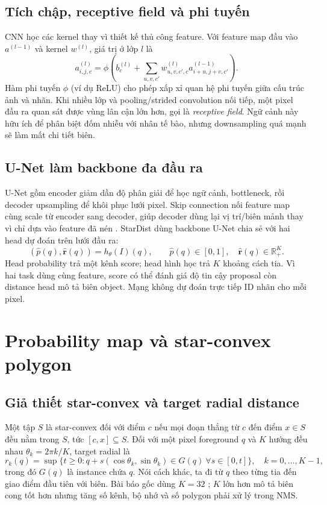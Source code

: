 \documentclass[12pt,a4paper]{report}
\begin{document}
\subsection{Tích chập, receptive field và phi tuyến}
CNN học các kernel thay vì thiết kế thủ công feature. Với feature map đầu vào
$a^{(l-1)}$ và kernel $w^{(l)}$, giá trị ở lớp $l$ là
\begin{equation}
 a_{i,j,c}^{(l)}=\phi\left(b_c^{(l)}+\sum_{u,v,c'}w_{u,v,c',c}^{(l)}
 a_{i+u,j+v,c'}^{(l-1)}\right).
 \label{eq:convolution}
\end{equation}
Hàm phi tuyến $\phi$ (ví dụ ReLU) cho phép xấp xỉ quan hệ phi tuyến giữa cấu
trúc ảnh và nhãn. Khi nhiều lớp và pooling/strided convolution nối tiếp, một
pixel đầu ra quan sát được vùng lân cận lớn hơn, gọi là \emph{receptive field}.
Ngữ cảnh này hữu ích để phân biệt đốm nhiễu với nhân tế bào, nhưng downsampling
quá mạnh sẽ làm mất chi tiết biên.

\subsection{U-Net làm backbone đa đầu ra}
U-Net gồm encoder giảm dần độ phân giải để học ngữ cảnh, bottleneck, rồi decoder
upsampling để khôi phục lưới pixel. Skip connection nối feature map cùng scale
từ encoder sang decoder, giúp decoder dùng lại vị trí/biên mảnh thay vì chỉ dựa
vào feature đã nén \citep{ronneberger2015unet}. StarDist dùng backbone U-Net chia sẻ với hai head dự đoán trên lưới đầu ra:
\begin{equation}
 (\hat p(q),\hat{\mathbf r}(q))=h_\theta(I)(q),\qquad
 \hat p(q)\in[0,1],\quad \hat{\mathbf r}(q)\in\mathbb{R}_+^K.
 \label{eq:stardist-heads}
\end{equation}
Head probability trả một kênh score; head hình học trả $K$ khoảng cách tia.
Vì hai task dùng cùng feature, score có thể đánh giá độ tin cậy proposal còn
distance head mô tả biên object. Mạng không dự đoán trực tiếp ID nhãn cho mỗi pixel.

\section{Probability map và star-convex polygon}
\subsection{Giả thiết star-convex và target radial distance}
Một tập $S$ là star-convex đối với điểm $c$ nếu mọi đoạn thẳng từ $c$ đến điểm
$x\in S$ đều nằm trong $S$, tức $[c,x]\subseteq S$. Đối với một pixel
foreground $q$ và $K$ hướng đều nhau $\theta_k=2\pi k/K$, target radial là
\begin{equation}
 r_k(q)=\sup\{t\ge0:q+s(\cos\theta_k,\sin\theta_k)\in G(q)\ \forall s\in[0,t]\},
 \quad k=0,\ldots,K-1,
 \label{eq:ray-distance}
\end{equation}
trong đó $G(q)$ là instance chứa $q$. Nói cách khác, ta đi từ $q$ theo từng tia
đến giao điểm đầu tiên với biên. Bài báo gốc dùng $K=32$ \citep{schmidt2018stardist};
$K$ lớn hơn mô tả biên cong tốt hơn nhưng tăng số kênh, bộ nhớ và số polygon
phải xử lý trong NMS.
\end{document}
